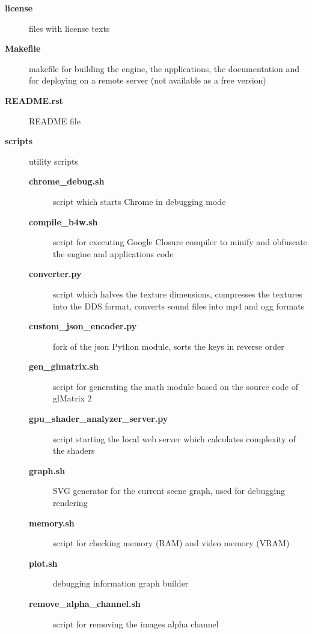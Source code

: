 \documentclass[a4paper,12pt,oneside]{sphinxmanual}
\begin{document}
\begin{description}
\item[{\textbf{license}}] \leavevmode
files with license texts

\item[{\textbf{Makefile}}] \leavevmode
makefile for building the engine, the applications, the documentation and for deploying on a remote server (not available as a free version)

\item[{\textbf{README.rst}}] \leavevmode
README file

\item[{\textbf{scripts}}] \leavevmode
utility scripts
\begin{description}
\item[{\textbf{chrome\_debug.sh}}] \leavevmode
script which starts Chrome in debugging mode

\item[{\textbf{compile\_b4w.sh}}] \leavevmode
script for executing Google Closure compiler to minify and obfuscate the engine and applications code

\item[{\textbf{converter.py}}] \leavevmode
script which halves the texture dimensions, compresses the textures into the DDS format, converts sound files into mp4 and ogg formats

\item[{\textbf{custom\_json\_encoder.py}}] \leavevmode
fork of the json Python module, sorts the keys in reverse order

\item[{\textbf{gen\_glmatrix.sh}}] \leavevmode
script for generating the math module based on the source code of glMatrix 2

\item[{\textbf{gpu\_shader\_analyzer\_server.py}}] \leavevmode
script starting the local web server which calculates complexity of the shaders

\item[{\textbf{graph.sh}}] \leavevmode
SVG generator for the current scene graph, used for debugging rendering

\item[{\textbf{memory.sh}}] \leavevmode
script for checking memory (RAM) and video memory (VRAM)

\item[{\textbf{plot.sh}}] \leavevmode
debugging information graph builder

\item[{\textbf{remove\_alpha\_channel.sh}}] \leavevmode
script for removing the images alpha channel


\end{description}
\end{description}
\end{document}

